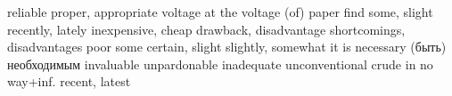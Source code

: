 \begin{multicols}{2}
	{reliable}
	{proper, appropriate}
	{voltage}
	{at the voltage (of)}
	{paper}
	{find}
	{some, slight}
	{recently, lately}
	{inexpensive, cheap}
	{drawback, disadvantage}
	{shortcomings, disadvantages}
	{poor}
	{some certain, slight}
	{slightly, somewhat}
	{it is necessary (быть) необходимым}
	{invaluable}
	{unpardonable}
	{inadequate}
	{unconventional}
	{crude}
	{in no way+inf.}
	{recent, latest}


\end{multicols}
